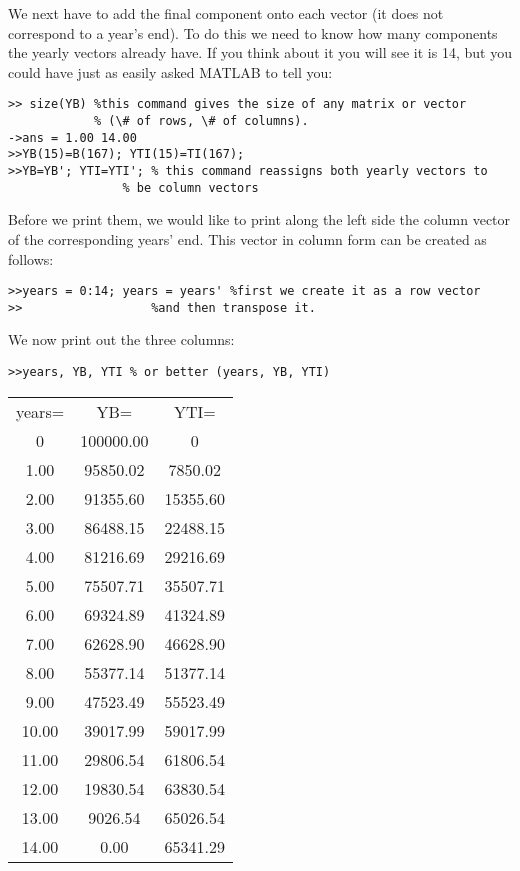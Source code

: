 \documentclass[../main.tex]{subfiles}
\begin{document}
We next have to add the final component onto each vector (it does not correspond
to a year's end). To do this we need to know how many components the yearly
vectors already have. If you think about it you will see it is 14, but you could have
just as easily asked MATLAB to tell you: 

\begin{verbatim}
>> size(YB) %this command gives the size of any matrix or vector
			% (\# of rows, \# of columns).
->ans = 1.00 14.00
>>YB(15)=B(167); YTI(15)=TI(167);
>>YB=YB'; YTI=YTI'; % this command reassigns both yearly vectors to
				% be column vectors
\end{verbatim}

Before we print them, we would like to print along the left side the column vector
of the corresponding years' end. This vector in column form can be created as
follows: 

\begin{verbatim}
>>years = 0:14; years = years' %first we create it as a row vector
>>					%and then transpose it.
\end{verbatim}

We now print out the three columns: 

\begin{verbatim}
>>years, YB, YTI % or better (years, YB, YTI)
\end{verbatim}

\noindent \begin{tabular}{ccc}
years=  &YB=  &YTI=  \\
		0&100000.00&0\\

		1.00&95850.02&7850.02\\

		2.00&91355.60&15355.60\\

		3.00&86488.15&22488.15\\

		4.00&81216.69&29216.69\\

		5.00&75507.71 &35507.71\\

		6.00&69324.89&41324.89\\
		
		7.00&62628.90&46628.90\\
		
		8.00&55377.14&51377.14\\
		
		9.00&47523.49&55523.49\\
		
		10.00&39017.99&59017.99\\
		
		11.00&29806.54&61806.54\\
		
		12.00&19830.54&63830.54\\
		
		13.00&9026.54 &65026.54\\
		
		14.00&0.00&65341.29\\
\end{tabular}
\end{document}
